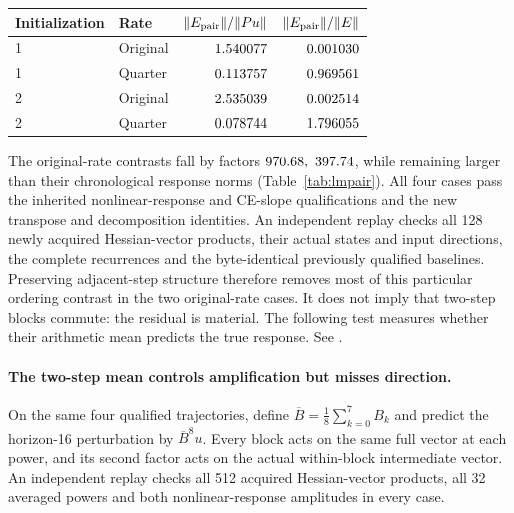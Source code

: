 \documentclass[11pt,letterpaper]{article}
\begin{document}
\par\medskip\noindent\begin{minipage}{\linewidth}
\captionsetup{hypcap=false}
\centering\small
\begin{tabular}{@{}llrr@{}}
\toprule
Initialization & Rate & $\|E_{\rm pair}\|/\|Pu\|$ & $\|E_{\rm pair}\|/\|E\|$ \\
\midrule
1 & Original & $1.540077$ & $0.001030$ \\
1 & Quarter & $0.113757$ & $0.969561$ \\
2 & Original & $2.535039$ & $0.002514$ \\
2 & Quarter & $0.078744$ & $1.796055$ \\
\bottomrule
\end{tabular}
\label{tab:lmpair}
\end{minipage}\par\medskip

The original-rate contrasts fall by factors $970.68,\ 397.74$, while
remaining larger than their chronological response norms
(Table~\ref{tab:lmpair}). All four cases pass the inherited nonlinear-response
and CE-slope qualifications and the new transpose and decomposition identities.
An independent replay checks all 128 newly acquired Hessian-vector products,
their actual states and input directions, the complete recurrences and the
byte-identical previously qualified baselines. Preserving adjacent-step
structure therefore removes most of this particular ordering contrast in
the two original-rate cases. It does not imply that two-step blocks commute:
the residual is material. The following test measures whether their arithmetic
mean predicts the true response.
See .

\paragraph{The two-step mean controls amplification but misses direction.}
On the same four qualified trajectories, define $\overline B=\tfrac18\sum_{k=0}^7B_k$
and predict the horizon-16 perturbation by $\overline B^8u$. Every block acts
on the same full vector at each power, and its second factor acts on the actual
within-block intermediate vector. An independent replay checks all 512 acquired
Hessian-vector products, all 32 averaged powers and both nonlinear-response
amplitudes in every case.
\end{document}
